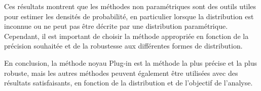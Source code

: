 Ces résultats montrent que les méthodes non paramétriques sont des outils utiles pour estimer les densités de probabilité, en particulier lorsque la distribution est inconnue ou ne peut pas être décrite par une distribution paramétrique. Cependant, il est important de choisir la méthode appropriée en fonction de la précision souhaitée et de la robustesse aux différentes formes de distribution.

En conclusion, la méthode noyau Plug-in est la méthode la plus précise et la plus robuste, mais les autres méthodes peuvent également être utilisées avec des résultats satisfaisants, en fonction de la distribution et de l'objectif de l'analyse.
\newpage
\thispagestyle{empty}
\null\newpage


